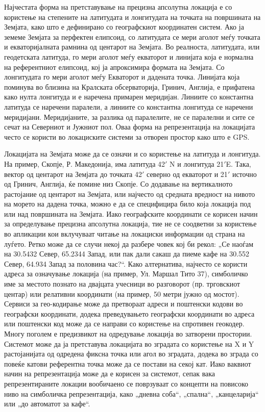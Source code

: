 Најчестата форма на претставување на прецизна
апсолутна локација е со користење на степените на латитудата и лонгитудата на
точката на површината на Земјата, како што е дефинирано со географскиот
координатен систем. Ако ја земеме Земјата за перфектен елипсоид, со латитудата
се мери аголот меѓу точката и екваторијалната рамнина од центарот на Земјата. Во
реалноста, латитудата, или геодетската латитуда, го мери аголот меѓу екваторот и
линијата која е нормална на референтниот елипсоид, кој ја апроксимира формата на
Земјата. Со лонгитудата го мери аголот меѓу Екваторот и дадената точка. Линијата
која поминува во близина на Кралската обсерваторија, Гринич, Англија, е
прифатена како нулта лонгитуда и е наречена примарен меридијан. Линиите со
константна латитуда се наречени паралели, а линиите со константна лонгитуда се
наречени меридијани. Меридијаните, за разлика од паралелите, не се паралелни и
сите се сечат на Северниот и Јужниот пол. Оваа форма на репрезентација на
локацијата често се користи во локациските системи за отворен простор како што е
GPS. 

Локацијата на Земјата може да се означи и со користење на латитуда и лонгитуда.
На пример, Скопје, Р. Македонија, има латитуда 42$'$ N и лонгитуда
21$'$E. Така, вектор од центарот на Земјата до точката
42$'$ северно од екваторот и 21$'$ источно од Гринич,
Англија, ќе помине низ Скопје. Со додавање на вертикалното растојание од
центарот на Земјата, или најчесто од средната вредност на нивото на морето на
дадена точка, можно е да се специфицира било која локација под или над
површината на Земјата. Иако географските координати се корисен начин за
определување прецизна апсолутна локација, тие не се соодветни за користење во
апликации кои вклучуваат читање на локациски информации од страна на луѓето.
Ретко може да се случи некој да разбере човек кој би рекол: „Се наоѓам на
30.5432 Север, 65.2344 Запад, или пак дали сакаш да пиеме кафе на 30.552 Север,
64.934 Запад за половина час?“. Како алтернатива, најчесто се користи адреса за
означување локација (на пример, Ул. Маршал Тито 37), симболичко име за местото
познато на двајцата учесници во разговорот (пр. трговскиот центар) или релативни
координати (на пример, 50 метри јужно од мостот). Сервиси за гео-кодирање може
да претвораат адреси и поштенски кодови во географски координати, додека
преведувањето географски координати во адреса или поштенски код може да се
направи со користење на спротивен геокодер. Многу поголем е предизвикот на
одредување локација во затворени простории. Системот може да ја претставува
локацијата во зградата со користење на X и Y растојанијата од одредена фиксна
точка или агол во зградата, додека во зграда со повеќе катови референтна точка
може да се постави на секој кат. Иако ваквиот начин на репрезентација може да е
корисен за системот, сепак вака репрезентираните локации вообичаено се
поврзуваат со концепти на повисоко ниво на симболичка репрезентација, како
„дневна соба“, „спална“, „канцеларија“ или „до автоматот за кафе“.

